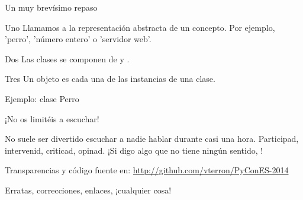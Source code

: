 \begin{frame}{Un muy brevísimo repaso}
  \small
  \begin{block}{\centering Uno}
    \centering
    Llamamos  a la representación abstracta de un
    concepto. Por ejemplo, 'perro', 'número entero' o 'servidor web'.
  \end{block}

  \begin{block}{\centering Dos}
    \centering
    Las clases se componen de  y
    .
  \end{block}

  \begin{block}{\centering Tres}
    \centering
    Un objeto es cada una de las instancias de una clase.
  \end{block}
\end{frame}

\begin{frame}{Ejemplo: clase Perro}
\end{frame}

\begin{frame}{¡No os limitéis a escuchar!}
  \begin{center}
    No suele ser divertido escuchar a nadie hablar durante casi una
    hora. Participad, intervenid, criticad, opinad. ¡Si digo algo que
    no tiene ningún sentido, !
  \end{center}

  \begin{block}{\centering Transparencias y código fuente en:}
    \centering \url{http://github.com/vterron/PyConES-2014}
  \end{block}

  \begin{center}
    \small Erratas, correcciones, enlaces, ¡cualquier cosa!
  \end{center}
\end{frame}
